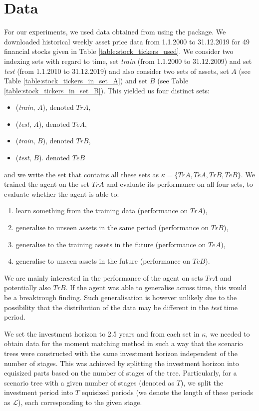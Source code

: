 \section{Data}
\label{section:data}
For our experiments, we used data obtained from \cite{yahoo} using the \cite[version 0.1.74]{yfinance} package. We downloaded historical weekly asset price data from 1.1.2000 to 31.12.2019 for 49 financial stocks given in Table \ref{table:stock_tickers_used}. We consider two indexing sets with regard to time, set \textit{train} (from 1.1.2000 to 31.12.2009) and set \textit{test} (from 1.1.2010 to 31.12.2019) and also consider two sets of assets, set $A$ (see Table \ref{table:stock_tickers_in_set_A}) and set $B$ (see Table \ref{table:stock_tickers_in_set_B}). This yielded us four distinct sets:
\begin{itemize}
\item (\textit{train}, $A$), denoted $TrA$,
\item (\textit{test}, $A$), denoted $TeA$,
\item (\textit{train}, $B$), denoted $TrB$,
\item (\textit{test}, $B$). denoted $TeB$
\end{itemize}
and we write the set that contains all these sets as $\kappa=\{TrA, TeA, TrB, TeB\}$.
We trained the agent on the set $TrA$ and evaluate its performance on all four sets, to evaluate whether the agent is able to:
\begin{enumerate}
\item learn something from the training data (performance on $TrA$),
\item generalise to unseen assets in the same period (performance on $TrB$),
\item generalise to the training assets in the future (performance on $TeA$),
\item generalise to unseen assets in the future (performance on $TeB$).
\end{enumerate}

\begin{rem}
We are mainly interested in the performance of the agent on sets $TrA$ and potentially also $TrB$. If the agent was able to generalise across time, this would be a breaktrough finding. Such generalisation is however unlikely due to the possibility that the distribution of the data may be different in the \textit{test} time period.
\end{rem}

We set the investment horizon to 2.5 years and from each set in $\kappa$, we needed to obtain data for the moment matching method in such a way that the scenario trees were constructed with the same investment horizon independent of the number of stages. This was achieved by splitting the investment horizon into equisized parts based on the number of stages of the tree.
Particularly, for a scenario tree with a given number of stages (denoted as $T$), we split the investment period into $T$ equisized periods (we denote the length of these periods as $\mathcal{L}$), each corresponding to the given stage.

